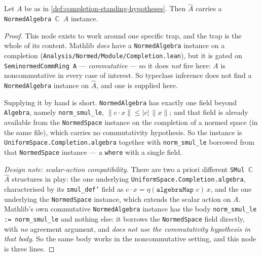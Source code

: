 \begin{lemma}
    \label{lmm:completion-normed-algebra}
    \leanok
    Let $A$ be as in \ref{def:completion-standing-hypotheses}. Then $\widehat{A}$ carries a \texttt{NormedAlgebra \ensuremath{\mathbb{C}} \ensuremath{\widehat{A}}} instance.
\end{lemma}
\begin{proof}
    \leanok
    This node exists to work around one specific trap, and the trap is the whole of its content. Mathlib \emph{does} have a \texttt{NormedAlgebra} instance on a completion (\texttt{Analysis/Normed/Module/Completion.lean}), but it is gated on \texttt{SeminormedCommRing A} --- \emph{commutative} --- so it does \emph{not} fire here: $A$ is noncommutative in every case of interest. So typeclass inference does not find a \texttt{NormedAlgebra} instance on $\widehat{A}$, and one is supplied here.

    Supplying it by hand is short. \texttt{NormedAlgebra} has exactly one field beyond \texttt{Algebra}, namely \texttt{norm\_smul\_le}, $\|c \cdot x\| \le |c|\,\|x\|$; and that field is already available from the \texttt{NormedSpace} instance on the completion of a normed space (in the same file), which carries no commutativity hypothesis. So the instance is \texttt{UniformSpace.Completion.algebra} together with \texttt{norm\_smul\_le} borrowed from that \texttt{NormedSpace} instance --- a \texttt{where} with a single field.

    \emph{Design note: scalar-action compatibility.} There are two a priori different \texttt{SMul \ensuremath{\mathbb{C}} \ensuremath{\widehat{A}}} structures in play: the one underlying \texttt{UniformSpace.Completion.algebra}, characterised by its \texttt{smul\_def'} field as $c \cdot x = \eta(\texttt{algebraMap } c)\, x$, and the one underlying the \texttt{NormedSpace} instance, which extends the scalar action on $A$. Mathlib's own commutative \texttt{NormedAlgebra} instance has the body \texttt{norm\_smul\_le := norm\_smul\_le} and nothing else: it borrows the \texttt{NormedSpace} field directly, with \emph{no} agreement argument, and \emph{does not use the commutativity hypothesis in that body}. So the same body works in the noncommutative setting, and this node is three lines.


\end{proof}
